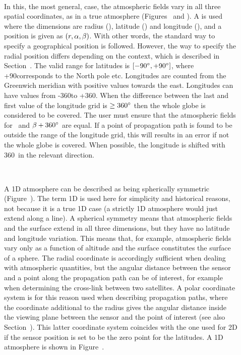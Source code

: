\begin{description}
  
\item[\,\,\,] In this, the most general, case, the
  atmospheric fields vary in all three spatial coordinates, as in a
  true atmosphere (Figures~ and
  ). A  is used where the dimensions are radius (\Rds), latitude
  (\Lat) and longitude (\Lon), and a position is given as
  $(r,\alpha,\beta)$. With other words, the standard way to specify a
  geographical position is followed.  However, the way to specify the
  radial position differs depending on the context, which is described
  in Section~. The valid range for
  latitudes is $[-90^\circ,+90^\circ]$, where +90\degree corresponds
  to the North pole etc. Longitudes are counted from the Greenwich
  meridian with positive values towards the east. Longitudes can have
  values from -360\degree to +360\degree. When the difference between
  the last and first value of the longitude grid is $\geq 360^\circ$
  then the whole globe is considered to be covered. The user must
  ensure that the atmospheric fields for \Lon\ and $\beta+360^\circ$
  are equal. If a point of propagation path is found to be outside the
  range of the longitude grid, this will results in an error if not
  the whole globe is covered. When possible, the longitude is shifted with
  360\degree\ in the relevant direction.
  
\item[\,\,\,] A 1D atmosphere can be described as being
  spherically symmetric (Figure~). The term 1D is
  used here for simplicity and historical reasons, not because it is a
  true 1D case (a strictly 1D atmosphere would just extend along a
  line). A spherical symmetry means that atmospheric fields and the
  surface extend in all three dimensions, but they have no latitude
  and longitude variation. This means that, for example, atmospheric
  fields vary only as a function of altitude and the surface
  constitutes the surface of a sphere. The radial coordinate is
  accordingly sufficient when dealing with atmospheric quantities, but
  the angular distance between the sensor and a point along the
  propagation path can be of interest, for example when determining
  the cross-link between two satellites. A polar coordinate system is
  for this reason used when describing propagation paths, where the
  coordinate additional to the radius gives the angular distance
  inside the viewing plane between the sensor and the point of
  interest (see also Section~). This latter
  coordinate system coincides with the one used for 2D if the sensor
  position is set to be the zero point for the latitudes. A 1D
  atmosphere is shown in Figure~.
  

\end{description}
